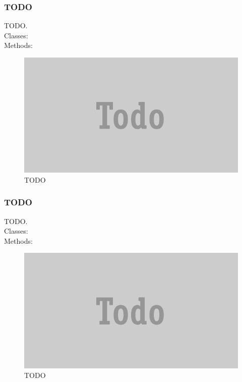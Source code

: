 \documentclass[JCDReport.tex]{subfiles}
\begin{document}
\subsubsection{TODO}
TODO.\\
Classes:\\
Methods:\\
\begin{figure}[h!]
	\centering
	\includegraphics[scale=1]{Images/todo.png} 
	\caption{TODO}
\end{figure}

\subsubsection{TODO}
TODO.\\
Classes:\\
Methods:\\
\begin{figure}[h!]
	\centering
	\includegraphics[scale=1]{Images/todo.png} 
	\caption{TODO}
\end{figure}
\end{document}
